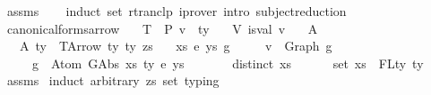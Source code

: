 \begin{isabellebody}
%
\isadelimproof
%
\endisadelimproof
%
\isatagproof
{}\isamarkupfalse%
\ assms\isanewline
\ \ \isamarkupfalse%
\ {\isacharparenleft}{\kern0pt}induct\ set{\isacharcolon}{\kern0pt}\ rtranclp{\isacharparenright}{\kern0pt}\ {\isacharparenleft}{\kern0pt}iprover\ intro{\isacharcolon}{\kern0pt}\ subject{\isacharunderscore}{\kern0pt}reduction{\isacharparenright}{\kern0pt}{\isacharplus}{\kern0pt}%
\endisatagproof
{\isafoldproof}%
%
\isadelimproof
%
\endisadelimproof
%
\isadelimdocument
%
\endisadelimdocument
%
\isatagdocument
%
\isamarkuptrue%
%
\endisatagdocument
{\isafolddocument}%
%
\isadelimdocument
%
\endisadelimdocument
{}\isamarkupfalse%
\ canonical{\isacharunderscore}{\kern0pt}forms{\isacharunderscore}{\kern0pt}arrow{\isacharcolon}{\kern0pt}\isanewline
\ \ \ T{\isacharcolon}{\kern0pt}\ {\isachardoublequoteopen}{\isasymGamma}\ {\isasymturnstile}{\isacharbraceleft}{\kern0pt}P{\isacharbraceright}{\kern0pt}\ v\ {\isacharcolon}{\kern0pt}\ ty{\isachardoublequoteclose}\isanewline
\ \ \ V{\isacharcolon}{\kern0pt}\ {\isachardoublequoteopen}is{\isacharunderscore}{\kern0pt}val\ v{\isachardoublequoteclose}\isanewline
\ \ \ A{}{\isacharcolon}{\kern0pt}\ {\isachardoublequoteopen}{\isasymGamma}\ {\isacharequal}{\kern0pt}\ {\isacharbrackleft}{\kern0pt}{\isacharbrackright}{\kern0pt}{\isachardoublequoteclose}\isanewline
\ \ \ A{}{\isacharcolon}{\kern0pt}\ {\isachardoublequoteopen}ty\ {\isacharequal}{\kern0pt}\ TArrow\ ty{}\ ty{}\ zs{\isachardoublequoteclose}\isanewline
\ \ \ {\isachardoublequoteopen}{\isasymexists}xs\ e{\isacharprime}{\kern0pt}\ ys\ g{\isachardot}{\kern0pt}\ \isanewline
\ \ \ \ {\isacharparenleft}{\kern0pt}v\ {\isacharequal}{\kern0pt}\ Graph\ g\ {\isasymand}\ \isanewline
\ \ \ \ \ g\ {\isasymsimeq}\ Atom\ {\isacharparenleft}{\kern0pt}GAbs\ xs\ ty{}\ e{\isacharprime}{\kern0pt}{\isacharparenright}{\kern0pt}\ ys\ {\isasymand}\ \isanewline
\ \ \ \ \ distinct\ xs\ {\isasymand}\isanewline
\ \ \ \ \ set\ xs\ {\isacharequal}{\kern0pt}\ FLty\ ty{}{\isacharparenright}{\kern0pt}{\isachardoublequoteclose}\isanewline
%
\isadelimproof
%
\endisadelimproof
%
\isatagproof
{}\isamarkupfalse%
\ assms\isanewline
{}\isamarkupfalse%
\ {\isacharparenleft}{\kern0pt}induct\ arbitrary{\isacharcolon}{\kern0pt}\ zs\ set{\isacharcolon}{\kern0pt}\ typing{\isacharparenright}{\kern0pt}\isanewline

\end{isabellebody}
